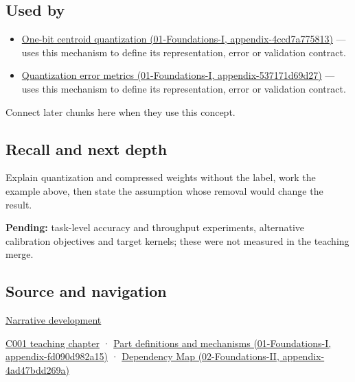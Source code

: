\subsection{Used by}\label{used-by}

\begin{itemize}
\tightlist
\item
  \href{}{One-bit centroid quantization (01-Foundations-I, appendix-4ccd7a775813)} --- uses this mechanism to define its representation, error or validation contract.
\item
  \href{}{Quantization error metrics (01-Foundations-I, appendix-537171d69d27)} --- uses this mechanism to define its representation, error or validation contract.
\end{itemize}

Connect later chunks here when they use this concept.

\subsection{Recall and next depth}\label{recall-and-next-depth}

Explain quantization and compressed weights without the label, work the example above, then state the assumption whose removal would change the result.

\textbf{Pending:} task-level accuracy and throughput experiments, alternative calibration objectives and target kernels; these were not measured in the teaching merge.

\subsection{Source and navigation}\label{source-and-navigation}

\href{Continuous\%20Notes/Computing\%20Foundations\%20-\%20From\%20Bits\%20to\%20C++\%20and\%20Systems\%20APIs\#Choosing\%20what\%20information\%20to\%20keep}{Narrative development}

\href{Continuous\%20Notes/Computing\%20Foundations\%20-\%20From\%20Bits\%20to\%20C++\%20and\%20Systems\%20APIs\#From\%20a\%20signal\%20to\%20an\%20interpretation}{C001 teaching chapter} · \href{}{Part definitions and mechanisms (01-Foundations-I, appendix-fd090d982a15)} · \href{}{Dependency Map (02-Foundations-II, appendix-4ad47bdd269a)}
